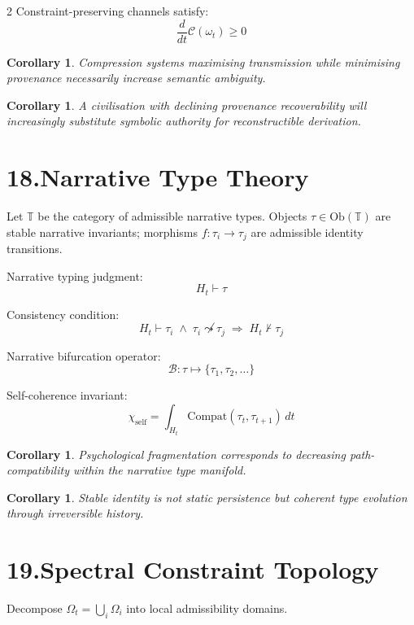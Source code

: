 \documentclass[10pt,a4paper]{article}
\theoremstyle{plain}
\newtheorem{corollary}[theorem]{Corollary}
\theoremstyle{remark}
\begin{document}
\begin{multicols}{2}
Constraint-preserving channels satisfy:
\[
\frac{d}{dt}\mathcal{C}(\omega_t)\geq0
\]

\begin{corollary}
Compression systems maximising transmission while minimising provenance
necessarily increase semantic ambiguity.
\end{corollary}

\begin{corollary}
A civilisation with declining provenance recoverability will increasingly
substitute symbolic authority for reconstructible derivation.
\end{corollary}

\section*{18.\enspace Narrative Type Theory}

Let $\mathbb{T}$ be the category of admissible narrative types.
Objects $\tau\in\mathrm{Ob}(\mathbb{T})$ are stable narrative invariants;
morphisms $f:\tau_i\to\tau_j$ are admissible identity transitions.

Narrative typing judgment:
\[
H_t \vdash \tau
\]

Consistency condition:
\[
H_t \vdash \tau_i
\;\wedge\;
\tau_i\not\leadsto\tau_j
\;\Rightarrow\;
H_t \nvdash \tau_j
\]

Narrative bifurcation operator:
\[
\mathcal{B}:\tau\mapsto\{\tau_1,\tau_2,\dots\}
\]

Self-coherence invariant:
\[
\chi_{\mathrm{self}}
=
\int_{H_t}
\mathrm{Compat}(\tau_t,\tau_{t+1})\,dt
\]

\begin{corollary}
Psychological fragmentation corresponds to decreasing path-compatibility
within the narrative type manifold.
\end{corollary}

\begin{corollary}
Stable identity is not static persistence but coherent type evolution
through irreversible history.
\end{corollary}

\section*{19.\enspace Spectral Constraint Topology}

Decompose $\Omega_t=\bigcup_i\Omega_i$ into local admissibility domains.


\end{multicols}
\end{document}
